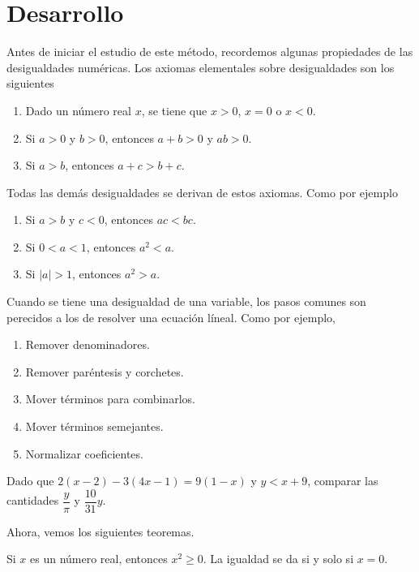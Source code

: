 \section{Desarrollo}

Antes de iniciar el estudio de este método, recordemos algunas propiedades de las desigualdades numéricas.
Los axiomas elementales sobre desigualdades son los siguientes

\begin{enumerate}
    \item Dado un número real $x$, se tiene que $x > 0$, $x = 0$ o $x < 0$.
    \item Si $a > 0$ y $b > 0$, entonces $a + b > 0$ y $ab > 0$.
    \item Si $a > b$, entonces $a + c > b + c$.
\end{enumerate}
Todas las demás desigualdades se derivan de estos axiomas.
Como por ejemplo
\begin{enumerate}
    \item Si $a > b$ y $c < 0$, entonces $ac < bc$.
    \item Si $0 < a < 1$, entonces $a^2 < a$.
    \item Si $|a| > 1$, entonces $a^2 > a$.
\end{enumerate}

Cuando se tiene una desigualdad de una variable, los pasos comunes son perecidos a los de resolver una ecuación líneal.
Como por ejemplo,
\begin{multicols}{2}
    \begin{enumerate}
        \item Remover denominadores.
        \item Remover paréntesis y corchetes.
        \item Mover términos para combinarlos.
        \item Mover términos semejantes.
        \item Normalizar coeficientes.
    \end{enumerate}
\end{multicols}

\begin{example}
    Dado que $2(x - 2) - 3(4x - 1) = 9(1 - x)$ y $y < x + 9$, comparar las cantidades $\dfrac{y}{\pi}$ y $\dfrac{10}{31}y$.
\end{example}


Ahora, vemos los siguientes teoremas.

\begin{box.theorem}{}{}
    Si $x$ es un número real, entonces $x^2 \geq 0$.
    La igualdad se da si y solo si $x = 0$.
\end{box.theorem}

